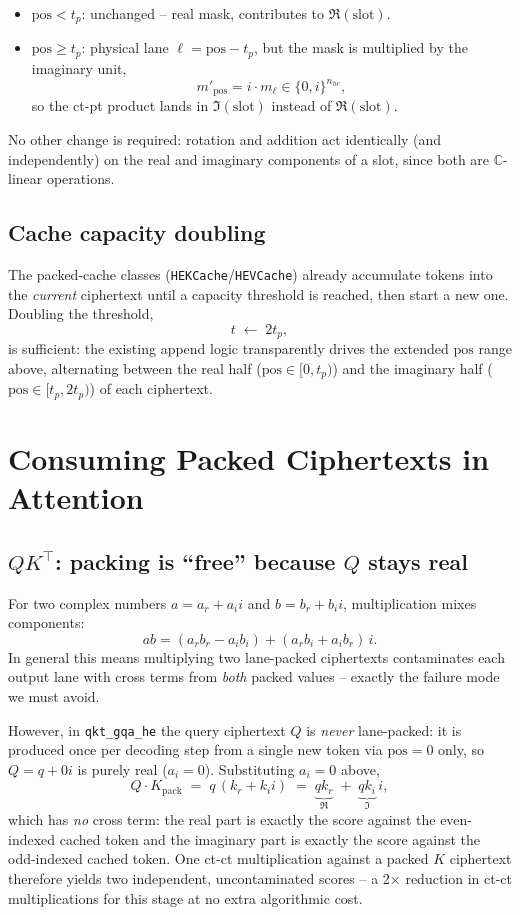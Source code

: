 \documentclass[11pt]{article}
\begin{document}
\begin{itemize}
  \item $\mathrm{pos} < t_p$: unchanged -- real mask, contributes to
        $\Re(\text{slot})$.
  \item $\mathrm{pos} \ge t_p$: physical lane
        $\ell = \mathrm{pos} - t_p$, but the mask is multiplied by the
        imaginary unit,
        \[
          m'_{\mathrm{pos}} = i \cdot m_{\ell} \in \{0, i\}^{n_{he}},
        \]
        so the ct-pt product lands in $\Im(\text{slot})$ instead of
        $\Re(\text{slot})$.
\end{itemize}
No other change is required: rotation and addition act identically (and
independently) on the real and imaginary components of a slot, since both
are $\mathbb{C}$-linear operations.

\subsection{Cache capacity doubling}
The packed-cache classes (\texttt{HEKCache}/\texttt{HEVCache}) already
accumulate tokens into the \emph{current} ciphertext until a capacity
threshold is reached, then start a new one. Doubling the threshold,
\[
  t \;\leftarrow\; 2 t_p ,
\]
is sufficient: the existing append logic transparently drives the extended
$\mathrm{pos}$ range above, alternating between the real half
($\mathrm{pos} \in [0, t_p)$) and the imaginary half
($\mathrm{pos} \in [t_p, 2t_p)$) of each ciphertext.

\section{Consuming Packed Ciphertexts in Attention}

\subsection{$QK^\top$: packing is ``free'' because $Q$ stays real}
For two complex numbers $a = a_r + a_i i$ and $b = b_r + b_i i$,
multiplication mixes components:
\[
  a b = (a_r b_r - a_i b_i) + (a_r b_i + a_i b_r)\, i .
\]
In general this means multiplying two lane-packed ciphertexts contaminates
each output lane with cross terms from \emph{both} packed values -- exactly
the failure mode we must avoid.

However, in \texttt{qkt\_gqa\_he} the query ciphertext $Q$ is \emph{never}
lane-packed: it is produced once per decoding step from a single new token
via $\mathrm{pos} = 0$ only, so $Q = q + 0i$ is purely real
($a_i = 0$). Substituting $a_i = 0$ above,
\[
  Q \cdot K_{\text{pack}} \;=\; q\,(k_r + k_i i) \;=\; \underbrace{q k_r}_{\Re}
  \;+\; \underbrace{q k_i}_{\Im}\, i ,
\]
which has \emph{no} cross term: the real part is exactly the score against
the even-indexed cached token and the imaginary part is exactly the score
against the odd-indexed cached token. One ct-ct multiplication against a
packed $K$ ciphertext therefore yields two independent, uncontaminated
scores -- a 2$\times$ reduction in ct-ct multiplications for this stage at
no extra algorithmic cost.
\end{document}
